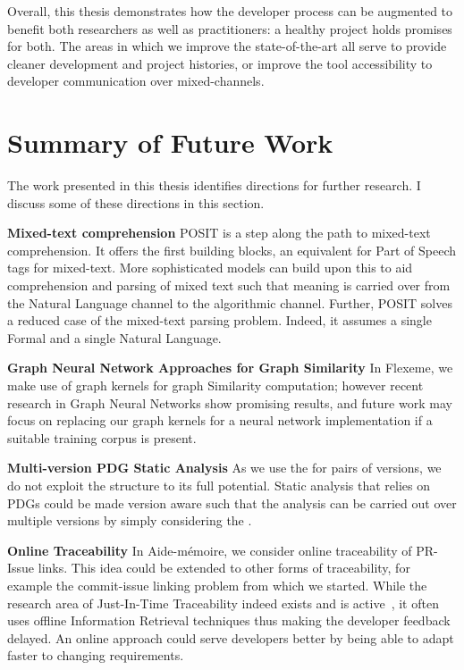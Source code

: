 Overall, this thesis demonstrates how the developer process can be augmented to
benefit both researchers as well as practitioners: a healthy project holds
promises for both. The areas in which we improve the state-of-the-art all serve
to provide cleaner development and project histories, or improve the tool
accessibility to developer communication over mixed-channels. 

\section{Summary of Future Work}
The work presented in this thesis identifies directions for further research. I discuss some of these directions in this section.

\textbf{Mixed-text comprehension}
POSIT is a step along the path to mixed-text comprehension. It offers the first
building blocks, an equivalent for Part of Speech tags for mixed-text. More
sophisticated models can build upon this to aid comprehension and parsing of
mixed text such that meaning is carried over from the Natural Language channel
to the algorithmic channel. Further, POSIT solves a reduced case of the
mixed-text parsing problem. Indeed, it assumes a single Formal and a single
Natural Language. 

\textbf{Graph Neural Network Approaches for Graph Similarity}
In Flexeme, we make use of graph kernels for graph Similarity computation;
however recent research in Graph Neural Networks show promising results, and
future work may focus on replacing our graph kernels for a neural network
implementation if a suitable training corpus is present.

\textbf{Multi-version PDG Static Analysis}
As we use the \deltaPDG for pairs of versions, we do not exploit the structure
to its full potential. Static analysis that relies on PDGs could be made version
aware such that the analysis can be carried out over multiple versions by simply
considering the \deltaPDG.

\textbf{Online Traceability}
In Aide-mémoire, we consider online traceability of PR-Issue links. This idea
could be extended to other forms of traceability, for example the commit-issue
linking problem from which we started. While the research area of Just-In-Time
Traceability indeed exists and is active~\cite{hayes2003improving,
lin2006poirot, lucia2007recovering, cleland2007best}, it often uses offline
Information Retrieval techniques thus making the developer feedback delayed. An
online approach could serve developers better by being able to adapt faster to
changing requirements.